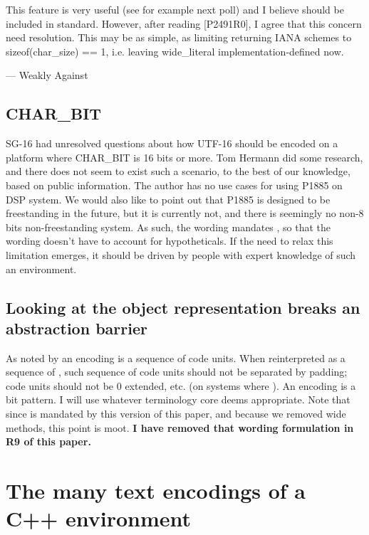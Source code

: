 \documentclass{wg21}
\begin{document}
\begin{quoteblock}
    This feature is very useful (see for example next poll) and I believe should be included in standard. However, after reading [P2491R0], I agree that this concern need resolution. This may be as simple, as limiting returning IANA schemes to sizeof(char_size) == 1, i.e. leaving wide_literal implementation-defined now.

    — Weakly Against
\end{quoteblock}


\subsection{CHAR_BIT}
SG-16 had unresolved questions about how UTF-16 should be encoded on a platform where CHAR_BIT is 16 bits or more.
Tom Hermann did some research, and there does not seem to exist such a scenario, to the best of our knowledge, based on public information.
The author has no use cases for using P1885 on DSP system.
We would also like to point out that P1885 is designed to be freestanding in the future, but it is currently not, and there is seemingly no non-8 bits
non-freestanding system.
As such, the wording mandates , so that the wording doesn't have to account for hypotheticals.
If the need to relax this limitation emerges, it should be driven by people with expert knowledge of such an environment.


\subsection{Looking at the object representation breaks an abstraction barrier}

As noted by  an encoding is a sequence of code units.
When reinterpreted as a sequence of , such sequence of code units should not be separated by padding; code units should not be 0 extended, etc. (on systems where ).
An encoding is a bit pattern.
I will use whatever terminology core deems appropriate. Note that since  is mandated by this version of this paper, and because we removed wide methods, this point is moot.
\textbf{I have removed that wording formulation in R9 of this paper.}

\pagebreak

\section{The many text encodings of a C++ environment}
\end{document}
